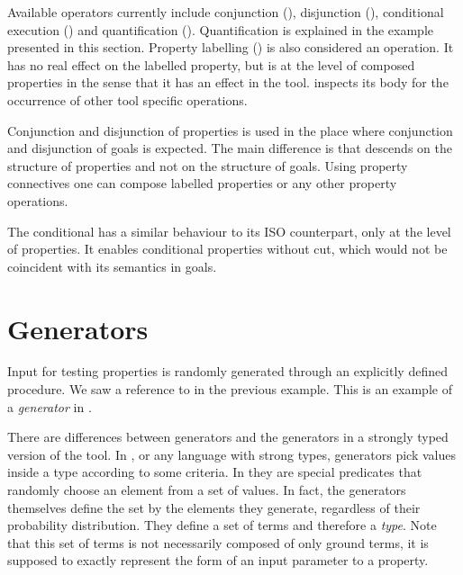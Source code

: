 Available operators currently include conjunction (), disjunction (),
conditional execution () and quantification ().
%
%
Quantification is explained in the example presented in this section.
%
Property labelling () is also considered an operation.
%
It has no real effect on the labelled property, but is at the level of
composed properties in the sense that it has an effect in the tool.
%
\plqc{} inspects its body for the occurrence of other tool specific
operations.


Conjunction and disjunction of properties is used in the place where
conjunction and disjunction of goals is expected.
%
The main difference is that \plqc{} descends on the structure of
properties and not on the structure of goals.
%
Using property connectives one can compose labelled properties or any
other \plqc{} property operations.


The conditional  has a similar behaviour to its ISO
\Prolog{} counterpart, only at the level of \plqc{} properties.
%
It enables conditional properties without cut, which would not be
coincident with its semantics in \Prolog{} goals.


\section{Generators}
\label{sec:generators}

Input for testing properties is randomly generated through an explicitly
defined procedure.
%
We saw a reference to  in the previous example.
%
This is an example of a \emph{generator} in \plqc{}.



There are  differences between \plqc{} generators and the
generators in a strongly typed version of the tool.
%
In \Haskell{} \QuickCheck{}, or any language with strong types,
generators pick values inside a type according to some criteria.
%
In \plqc{} they are special predicates that randomly choose an element
from a set of values.
%
In fact, the generators themselves define the set by the elements
they generate, regardless of their probability distribution.
%
They define a set of terms and therefore a \emph{type}.
%
Note that this set of terms is not necessarily composed of only ground terms, it
is supposed to exactly represent the form of an input parameter to a
property.


